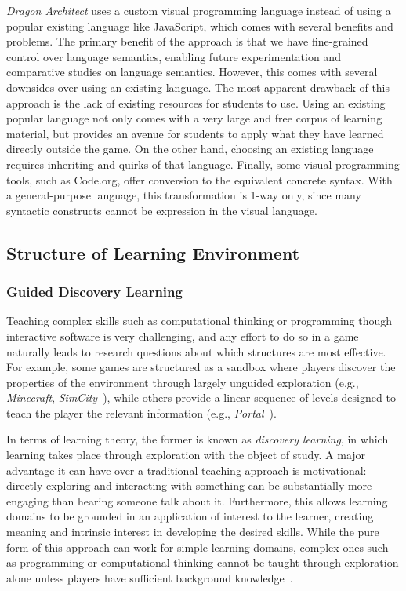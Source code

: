 \documentclass{sig-alternate}
\newcommand{\gametitle}{{\emph{Dragon Architect}}}
\begin{document}
\gametitle{} uses a custom visual programming language instead of using a popular existing language like JavaScript, which comes with several benefits and problems.
The primary benefit of the approach is that we have fine-grained control over language semantics, enabling future experimentation and comparative studies on language semantics.
However, this comes with several downsides over using an existing language.
The most apparent drawback of this approach is the lack of existing resources for students to use.
Using an existing popular language not only comes with a very large and free corpus of learning material, but provides an avenue for students to apply what they have learned directly outside the game.
On the other hand, choosing an existing language requires inheriting and quirks of that language.
Finally, some visual programming tools, such as Code.org, offer conversion to the equivalent concrete syntax.
With a general-purpose language, this transformation is 1-way only, since many syntactic constructs cannot be expression in the visual language.


\subsection{Structure of Learning Environment}

\subsubsection{Guided Discovery Learning}
\label{sec:guided_discovery_theory}

Teaching complex skills such as computational thinking or programming though interactive software is very challenging, and any effort to do so in a game naturally leads to research questions about which structures are most effective.
For example, some games are structured as a sandbox where players discover the properties of the environment through largely unguided exploration (e.g., \emph{Minecraft}, \emph{SimCity}~\cite{simcity}), while others provide a linear sequence of levels designed to teach the player the relevant information (e.g., \emph{Portal}~\cite{portal}). 

In terms of learning theory, the former is known as \emph{discovery learning}, in which learning takes place through exploration with the object of study.
A major advantage it can have over a traditional teaching approach is motivational: directly exploring and interacting with something can be substantially more engaging than hearing someone talk about it.
Furthermore, this allows learning domains to be grounded in an application of interest to the learner, creating meaning and intrinsic interest in developing the desired skills.
While the pure form of this approach can work for simple learning domains, complex ones such as programming or computational thinking cannot be taught through exploration alone unless players have sufficient background knowledge~\cite{kirschner2006minimal}. 
\end{document}
